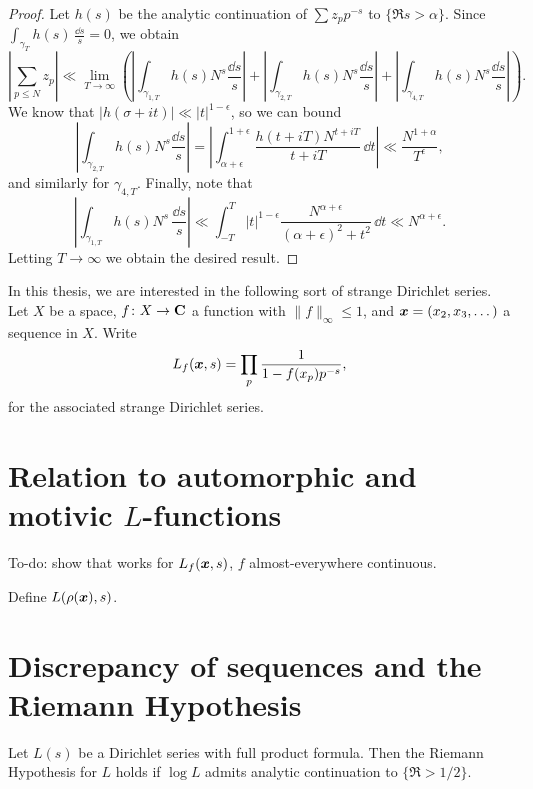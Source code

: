 \begin{proof}
Let $h(s)$ be the analytic continuation of $\sum z_p p^{-s}$ to 
$\{\Re s>\alpha\}$. Since $\int_{\gamma_T} h(s)\, \frac{\dd s}{s}=0$, we obtain 
\[
	\left|\sum_{p\leqslant N} z_p\right| 
		\ll \lim_{T\to \infty} \left(\left| \int_{\gamma_{1,T}} h(s) N^s\frac{\dd s}{s}\right| + \left|\int_{\gamma_{2,T}} h(s) N^s \frac{\dd s}{s}\right| + \left|\int_{\gamma_{4,T}} h(s) N^s \frac{\dd s}{s}\right| \right).
\]
We know that $|h(\sigma+i t)| \ll |t|^{1-\epsilon}$, so we can bound 
\[
	\left| \int_{\gamma_{2,T}} h(s)N^s \frac{\dd s}{s}\right| = \left| \int_{\alpha+\epsilon}^{1+\epsilon} \frac{h(t+i T) N^{t+i T}}{t+i T}\, \dd t\right| \ll \frac{N^{1+\alpha}}{T^\epsilon} ,
\]
and similarly for $\gamma_{4,T}$. Finally, note that 
\[
	\left| \int_{\gamma_{1,T}} h(s) N^s\, \frac{\dd s}{s}\right| \ll \int_{-T}^T |t|^{1-\epsilon} \frac{N^{\alpha+\epsilon}}{(\alpha+\epsilon)^2 + t^2} \, \dd t \ll N^{\alpha+\epsilon} .
\]
Letting $T\to \infty$ we obtain the desired result. 
\end{proof}

In this thesis, we are interested in the following sort of strange Dirichlet 
series. Let $X$ be a space, $f\colon X\to \mathbf{C}$ a function with 
$\|f\|_\infty\leqslant 1$, and ${\boldsymbol x}=(x_2,x_3,\dots)$ a sequence in $X$. Write 
\[
	L_f({\boldsymbol x},s) = \prod_p \frac{1}{1-f(x_p) p^{-s}} ,
\]
for the associated strange Dirichlet series. 





\section{Relation to automorphic and motivic \texorpdfstring{$L$}{L}-functions}


To-do: show that \cite[A.1]{serre-1989} works for $L_f({\boldsymbol x},s)$, $f$ 
almost-everywhere continuous. 

Define $L(\rho({\boldsymbol x}),s)$. 





\section{Discrepancy of sequences and the Riemann Hypothesis}

\begin{definition}
Let $L(s)$ be a Dirichlet series with full product formula. Then the Riemann 
Hypothesis for $L$ holds if $\log L$ admits analytic continuation 
to $\{\Re > 1/2\}$. 
\end{definition}

